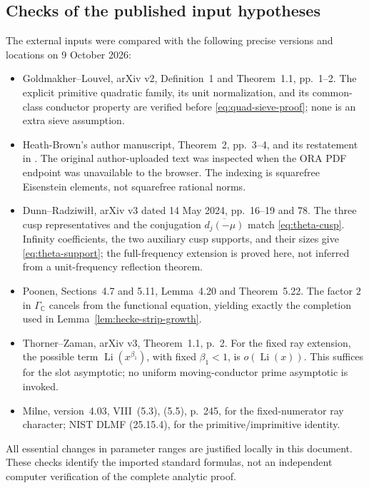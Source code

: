 \documentclass[12pt]{article}
\begin{document}
\subsection{Checks of the published input hypotheses}
The external inputs were compared with the following precise versions
and locations on 9 October 2026:
\begin{itemize}
\item Goldmakher--Louvel, arXiv v2, Definition~1 and Theorem~1.1,
pp.\ 1--2.  The explicit primitive quadratic family, its unit
normalization, and its common-class conductor property are verified
before \eqref{eq:quad-sieve-proof}; none is an extra sieve assumption.
\item Heath-Brown's author manuscript, Theorem~2, pp.\ 3--4,
and its restatement in \cite[Theorem 9.1]{DR}.
The original author-uploaded text was inspected when the ORA PDF endpoint
was unavailable to the browser.  The indexing is squarefree
Eisenstein elements, not squarefree rational norms.
\item Dunn--Radziwi{\l}{\l}, arXiv v3 dated 14 May 2024,
pp.\ 16--19 and 78.  The three cusp representatives and the
conjugation \(\overline{d_j(-\mu)}\) match
\eqref{eq:theta-cusp}.  Infinity coefficients, the two auxiliary
cusp supports, and their sizes give
\eqref{eq:theta-support}; the full-frequency extension is proved
here, not inferred from a unit-frequency reflection theorem.
\item Poonen, Sections~4.7 and 5.11, Lemma~4.20 and Theorem~5.22.
The factor \(2\) in \(\Gamma_{\mathbb C}\) cancels from the
functional equation, yielding exactly the completion used in
Lemma~\ref{lem:hecke-strip-growth}.
\item Thorner--Zaman, arXiv v3, Theorem~1.1, p.\ 2.
For the fixed ray extension, the possible term
\(\operatorname{Li}(x^{\beta_1})\), with fixed \(\beta_1<1\),
is \(o(\operatorname{Li}(x))\).  This suffices for the slot
asymptotic; no uniform moving-conductor prime asymptotic is invoked.
\item Milne, version~4.03, VIII~(5.3), (5.5), p.\ 245,
for the fixed-numerator ray character; NIST DLMF
(25.15.4), for the primitive/imprimitive identity.
\end{itemize}
All essential changes in parameter ranges are justified locally in
this document.  These checks identify the imported standard formulas,
not an independent computer verification of the complete analytic proof.
\end{document}
